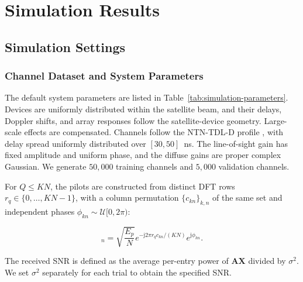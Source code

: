 \section{Simulation Results}
\label{sec:simulations}

\subsection{Simulation Settings}
\label{sec:simulation-settings}

\subsubsection{Channel Dataset and System Parameters}
The default system parameters are listed in
Table~\ref{tab:simulation-parameters}. Devices are uniformly distributed
within the satellite beam, and their delays, Doppler shifts, and array
responses follow the satellite-device geometry. Large-scale effects are
compensated. Channels follow the NTN-TDL-D profile \cite{shen2025},
with delay spread uniformly distributed over $[30,50]$~ns. The
line-of-sight gain has fixed amplitude and uniform phase, and the
diffuse gains are proper complex Gaussian.
We generate $50{,}000$ training channels and $5{,}000$ validation
channels.

For $Q\leq KN$, the pilots are constructed from distinct DFT rows
$r_q\in\{0,\ldots,KN-1\}$, with a column permutation
$\{c_{kn}\}_{k,n}$ of the same set and independent phases
$\phi_{kn}\sim\mathcal U[0,2\pi)$:

\begin{equation}
 [\mathbf p_{qk}]_n=\sqrt{\frac{E_p}{N}}
 e^{-\mathrm j2\pi r_qc_{kn}/(KN)}e^{\mathrm j\phi_{kn}}.
 \label{eq:pilot}
\end{equation}

The received SNR is defined as the average per-entry power of
$\mathbf A\mathbf X$ divided by $\sigma^2$. We set
$\sigma^2$ separately for each trial to obtain the specified SNR.


